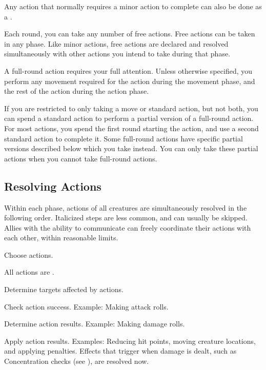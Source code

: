          Any action that normally requires a minor action to complete can also be done as a .

        \label{Free Actions} Each round, you can take any number of free actions.
        Free actions can be taken in any phase.
        Like minor actions, free actions are declared and resolved simultaneously with other actions you intend to take during that phase.

         A full-round action requires your full attention.
        Unless otherwise specified, you perform any movement required for the action during the movement phase, and the rest of the action during the action phase.

         If you are restricted to only taking a move or standard action, but not both, you can spend a standard action to perform a partial version of a full-round action. For most actions, you spend the first round starting the action, and use a second standard action to complete it. Some full-round actions have specific partial versions described below which you take instead. You can only take these partial actions when you cannot take full-round actions.

    \subsection{Resolving Actions}\label{Resolving Actions}

        Within each phase, actions of all creatures are simultaneously resolved in the following order.
        Italicized steps are less common, and can usually be skipped.
        Allies with the ability to communicate can freely coordinate their actions with each other, within reasonable limits.

        \begin{enumerate*}
            \item Choose actions.
            \item All actions are .
            \item Determine targets affected by actions.
            \item Check action success.
                Example: Making attack rolls.
            \item Determine action results.
                Example: Making damage rolls.
            \item Apply action results.
                Examples: Reducing hit points, moving creature locations, and applying penalties.
                Effects that trigger when damage is dealt, such as Concentration checks (see ), are resolved now.
        \end{enumerate*}

